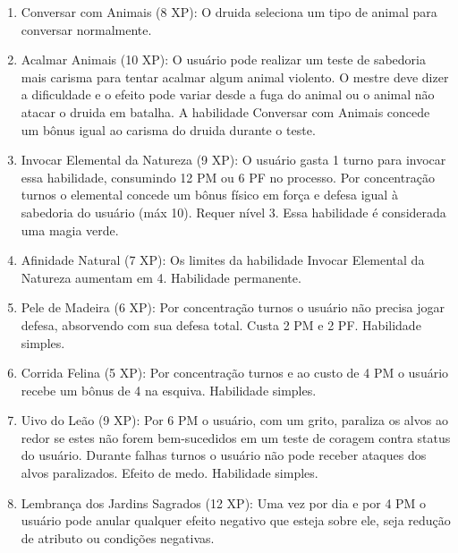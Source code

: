 \begin{enumerate}

  	\item Conversar com Animais (8 XP): O druida seleciona um tipo de animal para conversar normalmente. 
  	
  	\item Acalmar Animais (10 XP): O usuário pode realizar um teste de sabedoria mais carisma para tentar acalmar algum animal violento. O mestre deve dizer a dificuldade e o efeito pode variar desde a fuga do animal ou o animal não atacar o druida em batalha. A habilidade Conversar com Animais concede um bônus igual ao carisma do druida durante o teste.
  
  	\item Invocar Elemental da Natureza (9 XP): O usuário gasta 1 turno para invocar essa habilidade, consumindo 12 PM ou 6 PF no processo. Por concentração turnos o elemental concede um bônus físico em força e defesa igual à sabedoria do usuário (máx 10). Requer nível 3. Essa habilidade é considerada uma magia verde.

		\item Afinidade Natural (7 XP): Os limites da habilidade Invocar Elemental da Natureza aumentam em 4. Habilidade permanente.

  	\item Pele de Madeira (6 XP): Por concentração turnos o usuário não precisa jogar defesa, absorvendo com sua defesa total. Custa 2 PM e 2 PF. Habilidade simples.

	\item Corrida Felina (5 XP): Por concentração turnos e ao custo de 4 PM o usuário recebe um bônus de 4 na esquiva. Habilidade simples.

		\item Uivo do Leão (9 XP): Por 6 PM o usuário, com um grito, paraliza os alvos ao redor se estes não forem bem-sucedidos em um teste de coragem contra status do usuário. Durante falhas turnos o usuário não pode receber ataques dos alvos paralizados. Efeito de medo. Habilidade simples.

  	 
			\item Lembrança dos Jardins Sagrados (12 XP): Uma vez por dia e por 4 PM o usuário pode anular qualquer efeito negativo que esteja sobre ele, seja redução de atributo ou condições negativas.


\end{enumerate}
